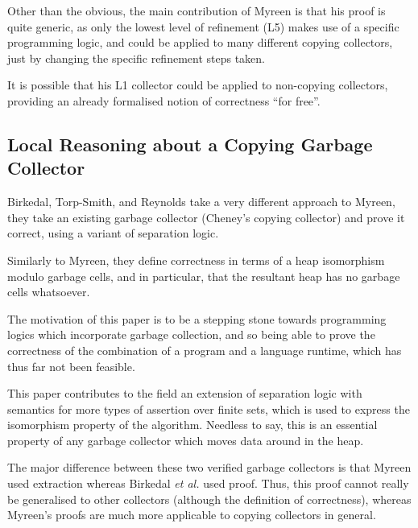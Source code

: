 Other than the obvious, the main contribution of Myreen is that his
proof is quite generic, as only the lowest level of refinement (L5)
makes use of a specific programming logic, and could be applied to many
different copying collectors, just by changing the specific refinement
steps taken.

It is possible that his L1 collector could be applied to non-copying
collectors, providing an already formalised notion of correctness
``for free''.

\subsection{Local Reasoning about a Copying Garbage Collector}

Birkedal, Torp-Smith, and Reynolds\cite{Birkedal04} take a very
different approach to Myreen, they take an existing garbage collector
(Cheney's copying collector) and prove it correct, using a variant of
separation logic.

Similarly to Myreen, they define correctness in terms of a heap
isomorphism modulo garbage cells, and in particular, that the
resultant heap has no garbage cells whatsoever.

The motivation of this paper is to be a stepping stone towards
programming logics which incorporate garbage collection, and so being
able to prove the correctness of the combination of a program and a
language runtime, which has thus far not been feasible.

This paper contributes to the field an extension of separation logic
with semantics for more types of assertion over finite sets, which is
used to express the isomorphism property of the algorithm. Needless to
say, this is an essential property of any garbage collector which
moves data around in the heap.

The major difference between these two verified garbage collectors is
that Myreen used extraction whereas Birkedal \textit{et al.} used
proof. Thus, this proof cannot really be generalised to other
collectors (although the definition of correctness), whereas Myreen's
proofs are much more applicable to copying collectors in general.
